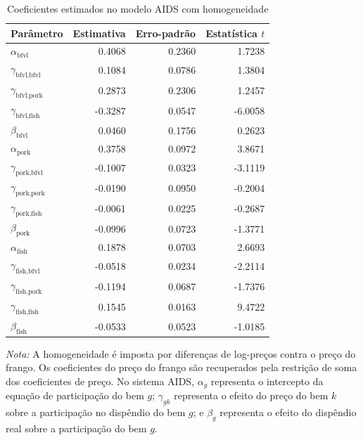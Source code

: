 \begin{table}[H]
\centering
\small
\caption{Coeficientes estimados no modelo AIDS com homogeneidade}
\label{tab:coeficientes-homogeneidade}
\begin{tabular}{@{}lrrr@{}}
\toprule
Parâmetro & Estimativa & Erro-padrão & Estatística $t$ \\
\midrule
$\alpha_{\text{bfvl}}$ & 0.4068 & 0.2360 & 1.7238 \\
$\gamma_{\text{bfvl},\text{bfvl}}$ & 0.1084 & 0.0786 & 1.3804 \\
$\gamma_{\text{bfvl},\text{pork}}$ & 0.2873 & 0.2306 & 1.2457 \\
$\gamma_{\text{bfvl},\text{fish}}$ & -0.3287 & 0.0547 & -6.0058 \\
$\beta_{\text{bfvl}}$ & 0.0460 & 0.1756 & 0.2623 \\
$\alpha_{\text{pork}}$ & 0.3758 & 0.0972 & 3.8671 \\
$\gamma_{\text{pork},\text{bfvl}}$ & -0.1007 & 0.0323 & -3.1119 \\
$\gamma_{\text{pork},\text{pork}}$ & -0.0190 & 0.0950 & -0.2004 \\
$\gamma_{\text{pork},\text{fish}}$ & -0.0061 & 0.0225 & -0.2687 \\
$\beta_{\text{pork}}$ & -0.0996 & 0.0723 & -1.3771 \\
$\alpha_{\text{fish}}$ & 0.1878 & 0.0703 & 2.6693 \\
$\gamma_{\text{fish},\text{bfvl}}$ & -0.0518 & 0.0234 & -2.2114 \\
$\gamma_{\text{fish},\text{pork}}$ & -0.1194 & 0.0687 & -1.7376 \\
$\gamma_{\text{fish},\text{fish}}$ & 0.1545 & 0.0163 & 9.4722 \\
$\beta_{\text{fish}}$ & -0.0533 & 0.0523 & -1.0185 \\
\bottomrule
\end{tabular}
\par\vspace{0.35em}
\begin{minipage}{0.92\textwidth}
\footnotesize\textit{Nota:} A homogeneidade é imposta por diferenças de log-preços contra o preço do frango. Os coeficientes do preço do frango são recuperados pela restrição de soma dos coeficientes de preço. No sistema AIDS, $\alpha_g$ representa o intercepto da equação de participação do bem $g$; $\gamma_{gk}$ representa o efeito do preço do bem $k$ sobre a participação no dispêndio do bem $g$; e $\beta_g$ representa o efeito do dispêndio real sobre a participação do bem $g$.
\end{minipage}
\end{table}

